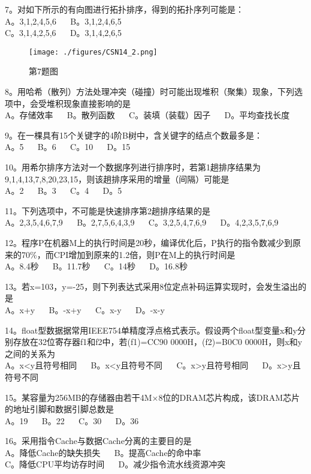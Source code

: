 7。对如下所示的有向图进行拓扑排序，得到的拓扑序列可能是： \\
A。3,1,2,4,5,6 $\quad$ B。3,1,2,4,6,5 \\
C。3,1,4,2,5,6 $\quad$ D。3,1,4,2,6,5
\begin{figure}[ht]
\centering
\texttt{[image: ./figures/CSN14\_2.png]}
\caption{第7题图} \label{CSN14_fig2}
\end{figure}

8。用哈希（散列）方法处理冲突（碰撞）时可能出现堆积（聚集）现象，下列选项中，会受堆积现象直接影响的是 \\
A。存储效率 $\quad$ B。散列函数 $\quad$ C。装填（装载）因子 $\quad$ D。平均查找长度

9。在一棵具有15个关键字的4阶B树中，含关键字的结点个数最多是： \\
A。5 $\quad$ B。6 $\quad$ C。10 $\quad$ D。15

10。用希尔排序方法对一个数据序列进行排序时，若第1趟排序结果为9,1,4,13,7,8,20,23,15，则该趟排序采用的增量（间隔）可能是 \\
A。2 $\quad$ B。3 $\quad$ C。4 $\quad$ D。5

11。下列选项中，不可能是快速排序第2趟排序结果的是 \\
A。2,3,5,4,6,7,9 $\quad$ B。2,7,5,6,4,3,9 $\quad$ C。3,2,5,4,7,6,9 $\quad$ D。4,2,3,5,7,6,9

12。程序P在机器M上的执行时间是20秒，编译优化后，P执行的指令数减少到原来的70\%，而CPI增加到原来的1.2倍，则P在M上的执行时间是 \\
A。8.4秒 $\quad$ B。11.7秒 $\quad$ C。14秒 $\quad$ D。16.8秒

13。若x=103，y=-25，则下列表达式采用8位定点补码运算实现时，会发生溢出的是 \\
A。x+y $\quad$ B。-x+y $\quad$ C。x-y $\quad$ D。-x-y

14。float型数据据常用IEEE754单精度浮点格式表示。假设两个float型变量x和y分别存放在32位寄存器f1和f2中，若(f1)=CC90 0000H，(f2)=B0C0 0000H，则x和y之间的关系为 \\
A。x<y且符号相同 $\quad$ B。x<y且符号不同 $\quad$ C。x>y且符号相同 $\quad$ D。x>y且符号不同

15。某容量为256MB的存储器由若干4M×8位的DRAM芯片构成，该DRAM芯片的地址引脚和数据引脚总数是 \\
A。19 $\quad$ B。22 $\quad$ C。30 $\quad$ D。36

16。采用指令Cache与数据Cache分离的主要目的是 \\
A。降低Cache的缺失损失 $\quad$ B。提高Cache的命中率 \\
C。降低CPU平均访存时间 $\quad$ D。减少指令流水线资源冲突


